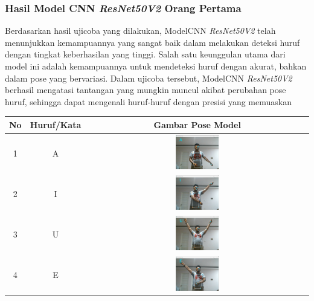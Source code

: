 \subsubsection*{Hasil Model CNN \textit{ResNet50V2 }Orang Pertama}

Berdasarkan hasil ujicoba yang dilakukan, ModelCNN \textit{ResNet50V2 }telah menunjukkan kemampuannya yang sangat baik dalam melakukan deteksi huruf dengan tingkat keberhasilan yang tinggi. Salah satu keunggulan utama dari model ini adalah kemampuannya untuk mendeteksi huruf dengan akurat, bahkan dalam pose yang bervariasi. Dalam ujicoba tersebut, ModelCNN \textit{ResNet50V2 }berhasil mengatasi tantangan yang mungkin muncul akibat perubahan pose huruf, sehingga dapat mengenali huruf-huruf dengan presisi yang memuaskan

\begin{table}[!hbt]
	\centering
	\label{tbl:Tabel Contoh Huruf/Kata dan Gambar Pose Model CNN ResNet50V2 Orang Pertama}
	\begin{tabular}{|c|c|c|}
	\hline
	No & Huruf/Kata & Gambar Pose Model  \\
	\hline
	1 & A & \includegraphics[width=0.2\textwidth]{gambar/bener/HurufA_ModelCNNResNet50V2_Dawe.png} \\
	\hline
	2 & I & \includegraphics[width=0.2\textwidth]{gambar/bener/HurufI_ModelCNNResNet50V2_Dawe.png} \\
	\hline
	3 & U & \includegraphics[width=0.2\textwidth]{gambar/bener/HurufU_ModelCNNResNet50V2_Dawe.png} \\
	\hline
	4 & E & \includegraphics[width=0.2\textwidth]{gambar/bener/HurufE_ModelCNNResNet50V2_Dawe.png} \\

\end{tabular}
\end{table}
